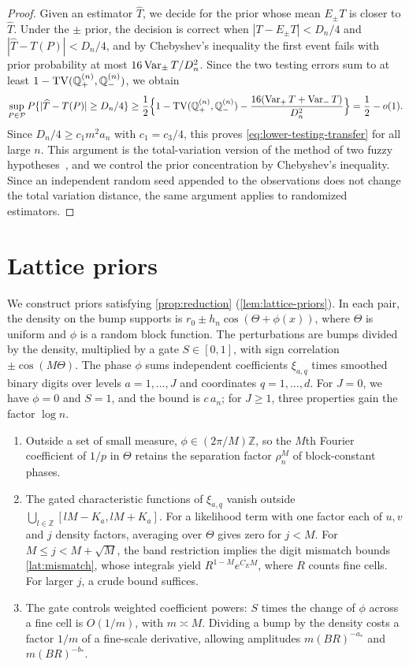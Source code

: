 \begin{proof}
Given an estimator $\widehat T$, we decide for the prior whose mean
$E_\pm T$ is closer to $\widehat T$. Under the $\pm$ prior, the decision
is correct when $|T-E_\pm T|<D_n/4$ and $|\widehat T-T(P)|<D_n/4$, and
by Chebyshev's inequality the first event fails with prior probability
at most $16\operatorname{Var}_\pm T/D_n^2$. Since the two testing errors sum to at
least $1-\operatorname{TV}(\mathbb Q_+^{(n)},\mathbb Q_-^{(n)})$, we obtain
\[
 \sup_{P\in\mathcal P}P\{|\widehat T-T(P)|\ge D_n/4\}
 \ge\frac12\Bigl\{1-\operatorname{TV}(\mathbb Q_+^{(n)},\mathbb Q_-^{(n)})
 -\frac{16(\operatorname{Var}_+T+\operatorname{Var}_-T)}{D_n^2}\Bigr\}=\frac12-o(1).
\]
Since $D_n/4\ge c_1m^2a_n$ with $c_1=c_3/4$, this proves
\eqref{eq:lower-testing-transfer} for all large $n$. This argument is
the total-variation version of the method of two fuzzy
hypotheses~\cite[Theorem~2.15]{tsybakov}, and we control the prior
concentration by Chebyshev's inequality. Since an independent
random seed appended to the observations does not change the total
variation distance, the same argument applies to randomized
estimators.
\end{proof}
\chapter{Lattice priors}\label{sec:lattice}

We construct priors satisfying \cref{prop:reduction}
(\cref{lem:lattice-priors}). In each pair, the density on the bump
supports is $r_0\pm h_n\cos(\Theta+\phi(x))$, where $\Theta$ is uniform
and $\phi$ is a random block function. The perturbations are bumps
divided by the density, multiplied by a gate $S\in[0,1]$, with sign
correlation $\pm\cos(M\Theta)$.
The phase $\phi$ sums independent coefficients $\xi_{a,q}$ times
smoothed binary digits over levels $a=1,\ldots,J$ and coordinates
$q=1,\ldots,d$. For $J=0$, we have $\phi=0$ and $S=1$, and the bound is
$c\,a_n$; for $J\ge1$, three properties gain the factor
$\log n$.
\begin{enumerate}[label=(\roman*)]
\item Outside a set of small measure, $\phi\in(2\pi/M)\mathbb Z$,
so the $M$th Fourier coefficient of $1/p$ in $\Theta$ retains the
separation factor $\rho_n^M$ of block-constant phases.
\item The gated characteristic functions of $\xi_{a,q}$ vanish outside
$\bigcup_{l\in\mathbb Z}[lM-K_a,lM+K_a]$. For a likelihood term with
one factor each of $u,v$ and $j$ density factors, averaging over
$\Theta$ gives zero for $j<M$. For $M\le j<M+\sqrt M$, the band
restriction implies the digit mismatch bounds \eqref{lat:mismatch},
whose integrals yield $R^{1-M}e^{C_EM}$, where $R$ counts fine cells.
For larger $j$, a crude bound suffices.
\item The gate controls weighted coefficient powers: $S$ times the
change of $\phi$ across a fine cell is $O(1/m)$, with $m\asymp M$.
Dividing a bump by the density costs a factor $1/m$ of a fine-scale
derivative, allowing amplitudes $m(BR)^{-a_*}$ and $m(BR)^{-b_*}$.
\end{enumerate}

